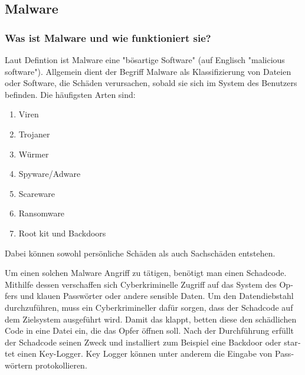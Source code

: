 \begin{otherlanguage}{ngerman}
\subsection{Malware}
\subsubsection{Was ist Malware und wie funktioniert sie?}

Laut Defintion ist Malware eine "bösartige Software"
(auf Englisch "malicious software").
\newline Allgemein dient der Begriff Malware als Klassifizierung von Dateien oder Software, die Schäden verursachen, sobald sie sich im System des Benutzers befinden. 
\newline Die häufigsten Arten sind:
\begin{enumerate}
    \item Viren
    \item Trojaner
    \item Würmer
    \item Spyware/Adware
    \item Scareware
    \item Ransomware
    \item Root kit und Backdoors
\end{enumerate}
Dabei können sowohl persönliche Schäden als auch Sachschäden entstehen.

Um einen solchen Malware Angriff zu tätigen, benötigt man einen Schadcode. 
Mithilfe dessen verschaffen sich Cyberkriminelle Zugriff auf das System des Opfers und klauen Passwörter oder andere sensible Daten.
Um den Datendiebstahl durchzuführen, muss ein Cyberkrimineller dafür sorgen, dass der Schadcode auf dem Zielsystem ausgeführt wird. 
Damit das klappt, betten diese den schädlichen Code in eine Datei ein, die das Opfer öffnen soll.
Nach der Durchführung erfüllt der Schadcode seinen Zweck und installiert zum Beispiel eine Backdoor oder startet einen Key-Logger. Key Logger können unter anderem die Eingabe von Passwörtern protokollieren.


\end{otherlanguage}

